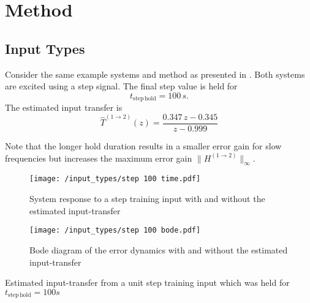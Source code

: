 \chapter{Method}
\section{Input Types}\label{sec:app_meth1}
\graphicspath{{./Bilder/transfer_function_estimation}} 


\begin{example}\label{ex:step_input_long}
	Consider the same example systems and method as presented in .
    Both systems are excited using a step signal. The final step value is held for 
    \begin{equation}
        t_{\mathrm{step\,hold}} = 100\,s.
    \end{equation} 
     The estimated input transfer is
     \begin{equation}
        \hat{T}^{(1 \rightarrow 2)}(z) = \frac{0.347\,z - 0.345}{z - 0.999} 
     \end{equation}
     \begin{notebox}
     Note that the longer hold duration results in a smaller error gain for slow frequencies but increases the maximum error gain $\|H^{(1 \rightarrow 2)}\|_{\infty}$.
     \end{notebox}

\begin{minipage}{1\textwidth}
\begingroup
	\centering
	\vspace{1em}
    \begin{subfigure}[t]{0.495\textwidth}
        \centering
        \texttt{[image: /input\_types/step 100 time.pdf]}
        \caption{System response to a step training input with and without the estimated input-transfer}
        \label{subfig:tf_est_input_step2_time}
    \end{subfigure}
    \hfill    
    \begin{subfigure}[t]{0.495\textwidth}
        \centering
        \texttt{[image: /input\_types/step 100 bode.pdf]}
        \caption{Bode diagram of the error dynamics with and without the estimated input-transfer}
        \label{subfig:tf_est_input_step2_bode}
    \end{subfigure}
    \caption[Training Inputs for Transfer Map Estimation (Step II)]{Estimated input-transfer from a unit step training input which was held for $t_{\mathrm{step\,hold}} = 100\unit{s}$}
    \label{subfig:tf_est_input_step2}
\endgroup
\end{minipage}
\end{example}



